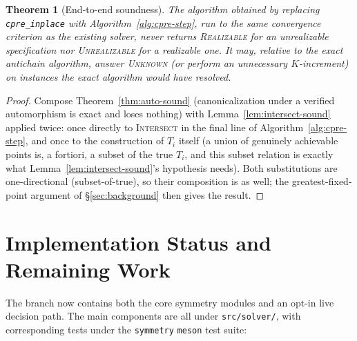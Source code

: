 \documentclass[11pt]{article}
\newtheorem{theorem}{Theorem}
\begin{document}
\begin{theorem}[End-to-end soundness]
The algorithm obtained by replacing \texttt{cpre\_inplace} with
Algorithm~\ref{alg:cpre-step}, run to the same convergence criterion as
the existing solver, never returns \textsc{Realizable} for an
unrealizable specification nor \textsc{Unrealizable} for a realizable one.
It may, relative to the exact antichain algorithm, answer
\textsc{Unknown} (or perform an unnecessary $K$-increment) on instances
the exact algorithm would have resolved.
\end{theorem}

\begin{proof}
Compose Theorem~\ref{thm:auto-sound} (canonicalization under a verified
automorphism is exact and loses nothing) with
Lemma~\ref{lem:intersect-sound} applied twice: once directly to
\textsc{Intersect} in the final line of Algorithm~\ref{alg:cpre-step}, and
once to the construction of $T_i$ itself (a union of genuinely achievable
points is, a fortiori, a subset of the true $T_i$, and this subset relation
is exactly what Lemma~\ref{lem:intersect-sound}'s hypothesis needs). Both
substitutions are one-directional (subset-of-true), so their composition
is as well; the greatest-fixed-point argument of \S\ref{sec:background}
then gives the result.
\end{proof}

\section{Implementation Status and Remaining Work}
\label{sec:status}

The branch now contains both the core symmetry modules and an opt-in live
decision path. The main components are all under \texttt{src/solver/}, with
corresponding tests under the \texttt{symmetry} \texttt{meson} test suite:
\end{document}
